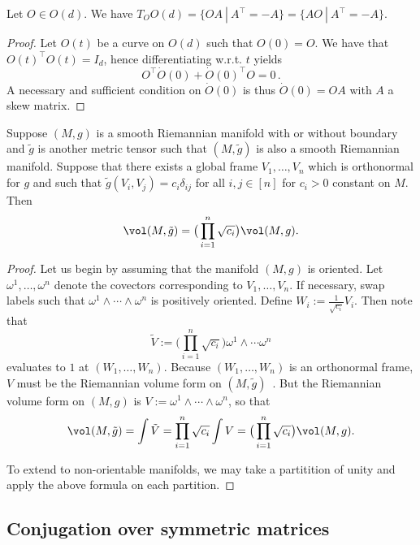 \documentclass[twoside,a4paper,11pt]{article}
\theoremstyle{plain}
\begin{document}
\begin{lemma}
    \label{lemma:tangent_space_O(d)}
    Let $O \in O(d)$. We have $T_O O(d) = \{ OA ~| ~ A^\top = -A\} = \{ AO ~| ~ A^\top = -A\}$.
\end{lemma}
\begin{proof}
    Let $O(t)$ be a curve on $O(d)$ such that $O(0)=O$. We have that $O(t)^\top O(t) = I_d$, hence differentiating w.r.t. $t$ yields 
    $$
    O^\top \dot{O}(0) + \dot{O}(0)^\top O = 0 \, .
    $$
    A necessary and sufficient condition on $\dot{O}(0)  $ is thus $\dot{O}(0) = OA$ with $A$ a skew matrix. 
\end{proof}

\begin{lemma}
\label{lem:parallelizable}
Suppose $(M, g)$ is a smooth
Riemannian
manifold with or without boundary
and $\tilde g$ is another
metric tensor such that $(M, \tilde g)$
is also a smooth Riemannian manifold.
Suppose that there exists a global
frame $V_1, \ldots, V_n$
which is orthonormal 
for $g$ and such that 
$\tilde g(V_i, V_j) = c_i\delta_{ij}$ for all $i, j \in [n]$
for $c_i > 0$ constant
on $M$.
Then 
$$
\vol(M, \tilde g) =\big( \prod_{i = 1}^n
\sqrt{c_i}\big) \vol(M, g).
$$
\end{lemma}

\begin{proof} Let us begin
by assuming that the manifold $(M, g)$
is oriented.
Let $\omega^1, \ldots, \omega^n$ denote
the covectors corresponding to
$V_1, \ldots, V_n$. If necessary,
swap labels such that $\omega^1 \land \cdots \land \omega^n$ is positively oriented.
Define
$W_i := \frac{1}{\sqrt{c_i}} V_i$. Then note
that
$$
\tilde V:= \big(\prod_{i= 1}^n \sqrt{c_i}\big) \omega^1 \land \cdots 
\omega^n
$$ evaluates to $1$ at $(W_1, \ldots, W_n)$.
Because $(W_1, \ldots, W_n)$ is an orthonormal
frame, $V$ must be the Riemannian volume form on
$(M, \tilde g)$~\cite[Proposition 15.29]{lee2013introduction}.
But the Riemannian volume form
on $(M, g)$ is $V:=\omega^1 \land \cdots \land \omega^n$, so that 
$$
\vol(M, \tilde g) = \int \tilde V = 
\prod_{i= 1}^n \sqrt{c_i} \int V = 
\big(\prod_{i =1 }^n \sqrt{c_i} \big) \vol(M, g).
$$

To extend to non-orientable manifolds, we may take
a partitition of unity and apply
the above formula on each partition.
\end{proof}


\subsection{Conjugation over symmetric matrices}
\end{document}
